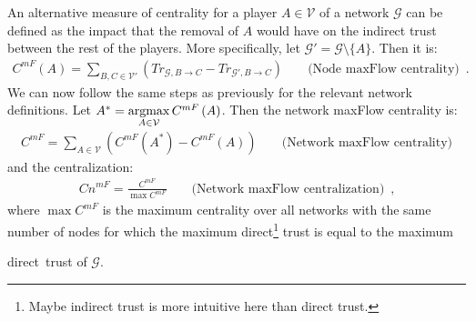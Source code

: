     An alternative measure of centrality for a player $A \in \mathcal{V}$ of a network $\mathcal{G}$ can be defined as the
    impact that the removal of $A$ would have on the indirect trust between the rest of the players. More specifically, let
    $\mathcal{G}' = \mathcal{G} \setminus \{A\}$. Then it is:
    \begin{align*}
      C^{mF}\left(A\right) = \sum\limits_{B,C \in \mathcal{V}'}\left(Tr_{\mathcal{G}, B \rightarrow C} - Tr_{\mathcal{G}', B
      \rightarrow C}\right) && \mbox{ (Node maxFlow centrality)} \enspace.
    \end{align*}
    We can now follow the same steps as previously for the relevant network definitions. Let $A^* = \operatorname*{argmax}\limits_{A \in
    \mathcal{V}}C^{mF}\left(A\right)$. Then the network maxFlow centrality is:
    \begin{align*}
      C^{mF} = \sum\limits_{A \in \mathcal{V}}\left(C^{mF}\left(A^*\right) - C^{mF}\left(A\right)\right) && \mbox{ (Network
      maxFlow centrality)}
    \end{align*}
    and the centralization:
    \begin{align*}
      Cn^{mF} = \frac{C^{mF}}{\max C^{mF}} && \mbox{ (Network maxFlow centralization)} \enspace,
    \end{align*}
    where $\max C^{mF}$ is the maximum centrality over all networks with the same number of nodes for which the maximum
    direct\footnote{Maybe indirect trust is more intuitive here than direct trust.} trust is equal to the maximum
    \addtocounter{footnote}{-1} direct\footnotemark \ trust of $\mathcal{G}$.

    \noindent\hrulefill
    \newpage
